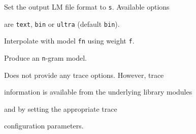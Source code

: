 \begin{optlist}


{


   Set the output LM file format to \texttt{s}. Available options


  are \texttt{text}, \texttt{bin} or \texttt{ultra} (default \texttt{bin}).





   Interpolate with model \texttt{fn} using weight \texttt{f}.





   Produce an \texttt{n}-gram model.





}


\end{optlist}















 Does not provide any trace options. However, trace 


information is available from the underlying library modules 


 and  by setting the appropriate trace


configuration parameters.







